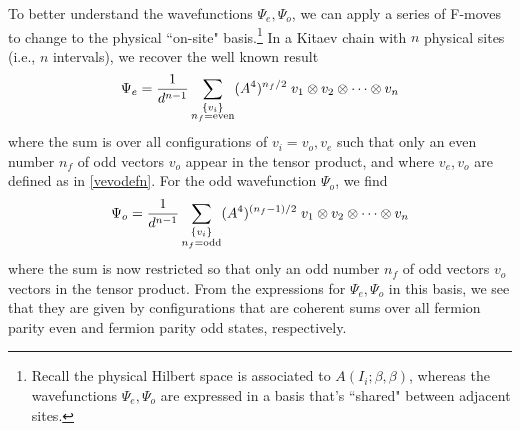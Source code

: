 
To better understand the wavefunctions $\Psi_e,\Psi_o$, we can apply a series of F-moves to change to the physical ``on-site" basis.\footnote{Recall the physical Hilbert space is associated to $A(I_i;\beta, \beta)$, 
whereas the wavefunctions $\Psi_e,\Psi_o$ are expressed in a basis that's ``shared" between adjacent sites.}
In a Kitaev chain with $n$ physical sites (i.e., $n$ intervals), 
we recover the well known result
\begin{align}
\Psi_e = \frac{1}{d^{n-1}} \sum_{\substack{ \{ v_i\} \\  n_f = \text{even} }} (A^4)^{n_f/2} \; v_1 \otimes v_2 \otimes \cdots \otimes v_n
\end{align}
where the sum is over all configurations of $v_i =v_o,v_e$ such that only an even number $n_f$ of odd vectors $v_o$ appear 
in the tensor product, and where $v_e,v_o$ are defined as in \eqref{vevodefn}.
For the odd wavefunction $\Psi_o$, we find 
\begin{align}
\Psi_o = \frac{1}{d^{n-1}}\sum_{\substack{ \{ v_i\} \\  n_f = \text{odd} }}  (A^4)^{(n_f-1)/2}\; v_1 \otimes v_2 \otimes \cdots \otimes v_n
\end{align}
where the sum is now restricted so that only an odd number $n_f$ of odd vectors $v_o$ vectors in the tensor product.
From the expressions for $\Psi_e,\Psi_o$ in this basis, we see that they are given by configurations 
that are coherent sums over all fermion parity even and fermion parity odd states, respectively.  

